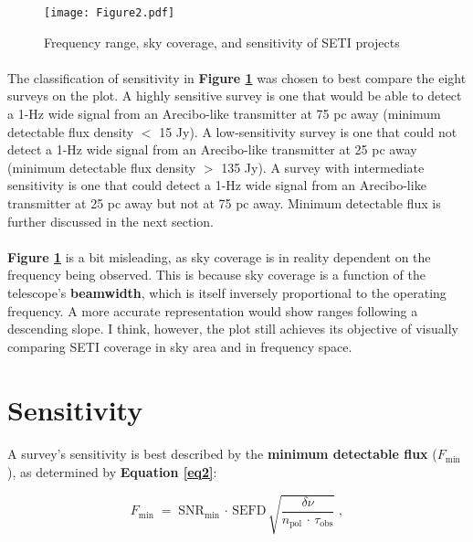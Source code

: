 \documentclass{article}
\begin{document}
\begin{figure}[H]
\begin{center}
\texttt{[image: Figure2.pdf]}
\caption{Frequency range, sky coverage, and sensitivity of SETI projects \textbf{\label{fig3}}}
\end{center}
\end{figure}

\paragraph{}
The classification of sensitivity in \textbf{Figure \ref{fig3}} was chosen to best compare the eight surveys on the plot. A highly sensitive survey is one that would be able to detect a 1-Hz wide signal from an Arecibo-like transmitter at 75 pc away (minimum detectable flux density $<$ 15 Jy). A low-sensitivity survey is one that could not detect a 1-Hz wide signal from an Arecibo-like transmitter at 25 pc away (minimum detectable flux density $>$ 135 Jy). A survey with intermediate sensitivity is one that could detect a 1-Hz wide signal from an Arecibo-like transmitter at 25 pc away but not at 75 pc away. Minimum detectable flux is further discussed in the next section.

\paragraph{}
\textbf{Figure \ref{fig3}} is a bit misleading, as sky coverage is in reality dependent on the frequency being observed. This is because sky coverage is a function of the telescope's \textbf{beamwidth}, which is itself inversely proportional to the operating frequency. A more accurate representation would show ranges following a descending slope. I think, however, the plot still achieves its objective of visually comparing SETI coverage in sky area and in frequency space.


\section{Sensitivity}

\paragraph{}
A survey's sensitivity is best described by the \textbf{minimum detectable flux} ($F_{\textrm{min}}$), as determined by \textbf{Equation \ref{eq2}}:

\begin{equation}
F_{\textrm{min}} \; = \; \textrm{SNR}_{\textrm{min}} \, \cdot \, \textrm{SEFD} \, \sqrt{\frac{\delta \nu}{n_{\textrm{pol}} \, \cdot \, \tau_{\textrm{obs}}}} \; ,
\label{eq2}
\end{equation}
\end{document}
